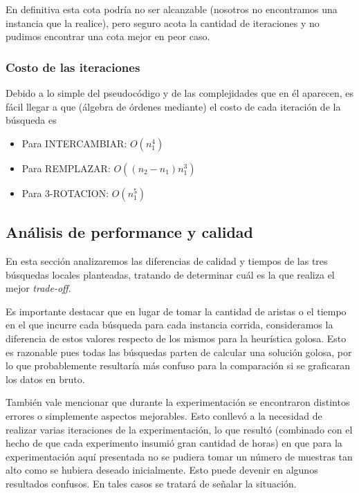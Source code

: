 En definitiva esta cota podría no ser alcanzable (nosotros no encontramos una instancia que la realice), pero seguro acota la cantidad de iteraciones y no pudimos encontrar una cota mejor en peor caso.

\subsubsection{Costo de las iteraciones}
Debido a lo simple del pseudocódigo y de las complejidades que en él aparecen, es fácil llegar a que (álgebra de órdenes mediante) el costo de cada iteración de la búsqueda es 

\begin{itemize}
\item Para INTERCAMBIAR: $O(n_1^4)$
\item Para REMPLAZAR: $O((n_2-n_1) n_1^3)$
\item Para 3-ROTACION: $O(n_1^5)$
\end{itemize}

\subsection{Análisis de performance y calidad}
En esta sección analizaremos las diferencias de calidad y tiempos de las tres búsquedas locales planteadas, tratando de determinar cuál es la que realiza el mejor \emph{trade-off}.

Es importante destacar que en lugar de tomar la cantidad de aristas o el tiempo en el que incurre cada búsqueda para cada instancia corrida, consideramos la diferencia de estos valores respecto de los mismos para la heurística golosa. Esto es razonable pues todas las búsquedas parten de calcular una solución golosa, por lo que probablemente resultaría más confuso para la comparación si se graficaran los datos en bruto.

También vale mencionar que durante la experimentación se encontraron distintos errores o simplemente aspectos mejorables. Esto conllevó a la necesidad de realizar varias iteraciones de la experimentación, lo que resultó (combinado con el hecho de que cada experimento insumió gran cantidad de horas) en que para la experimentación aquí presentada no se pudiera tomar un número de muestras tan alto como se hubiera deseado inicialmente. Esto puede devenir en algunos resultados confusos. En tales casos se tratará de señalar la situación.

